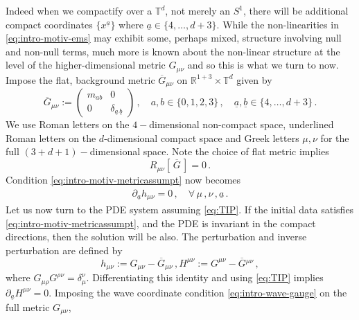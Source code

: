 \documentclass[11pt, a4paper]{amsart}
\numberwithin{equation}{section}
\numberwithin{theorem}{section}
\newcommand{\R}{\mathbb{R}}
\newcommand{\p}{\partial}
\newcommand{\mn}{{\mu \nu}}
\newcommand{\tee}{{\mathbb{T}^d}}
\newcommand{\abar}{{\underline{a}}}
\newcommand{\bbar}{{\underline{b}}}
\newcommand{\gzero}{\overline{G}}
\begin{document}
Indeed when we compactify over a $\tee$, not merely an $S^1$, there will be additional compact coordinates $\{ x^\abar \}$ where $\abar \in \{ 4, \ldots, d+3\}$. While the non-linearities in \eqref{eq:intro-motiv-ems} may exhibit some, perhaps mixed, structure involving null and non-null terms, much more is known about the non-linear structure at the level of the higher-dimensional metric $G_\mn$ and so this is what we turn to now. Impose the flat, background metric $\gzero_\mn$ on $\R^{1+3} \times \tee$ given by
$$ \gzero_\mn := \begin{pmatrix}
m_{ab} & 0 \\ 0 & \delta_{\abar \, \bbar} 
\end{pmatrix} \,, \quad a,b \in \{ 0, 1, 2, 3 \} \,,  \quad \abar, \bbar \in \{ 4, \ldots, d+3\} \,. $$ 
We use Roman letters on the $4-$dimensional non-compact space, underlined Roman letters on the $d$-dimensional compact space and Greek letters $\mu, \nu$ for the full $(3+d+1)-$dimensional space. Note the choice of flat metric implies 
$$ R_\mn [\, \gzero \,] = 0 \,.$$ 
Condition \eqref{eq:intro-motiv-metricassumpt} now becomes
\begin{align}
\p_\abar h_\mn = 0\,, \quad \forall \, \mu \,, \nu \,, \abar \,. \label{eq:TIP}
\end{align}
Let us now turn to the PDE system assuming \eqref{eq:TIP}. If the initial data satisfies \eqref{eq:intro-motiv-metricassumpt}, and the PDE is invariant in the compact directions, then the solution will be also.
The perturbation and inverse perturbation are defined by 
$$ h_\mn := G_\mn - \gzero_\mn \,, H^\mn := G^\mn - \gzero{}^\mn \,, $$
where $G_{\mu \rho } G^{\rho \nu} = \delta^\nu_\mu$.   Differentiating this identity and using \eqref{eq:TIP} implies $\p_\abar H^\mn = 0$.
Imposing the wave coordinate condition \eqref{eq:intro-wave-gauge} on the full metric $G_\mn$, 
\end{document}
